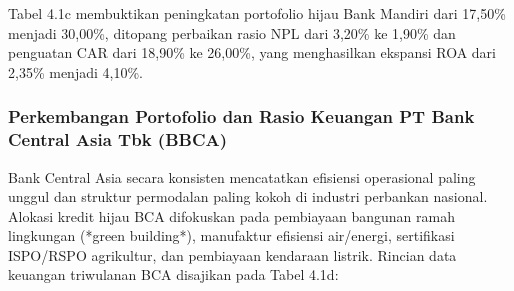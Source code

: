 \documentclass[12pt,a4paper]{article}
\numberwithin{equation}{section}
\begin{document}
\noindent
Tabel 4.1c membuktikan peningkatan portofolio hijau Bank Mandiri dari 17,50\% menjadi 30,00\%, ditopang perbaikan rasio NPL dari 3,20\% ke 1,90\% dan penguatan CAR dari 18,90\% ke 26,00\%, yang menghasilkan ekspansi ROA dari 2,35\% menjadi 4,10\%.

\subsubsection{Perkembangan Portofolio dan Rasio Keuangan PT Bank Central Asia Tbk (BBCA)}
\noindent
Bank Central Asia secara konsisten mencatatkan efisiensi operasional paling unggul dan struktur permodalan paling kokoh di industri perbankan nasional. Alokasi kredit hijau BCA difokuskan pada pembiayaan bangunan ramah lingkungan (*green building*), manufaktur efisiensi air/energi, sertifikasi ISPO/RSPO agrikultur, dan pembiayaan kendaraan listrik. Rincian data keuangan triwulanan BCA disajikan pada Tabel 4.1d:
\end{document}
